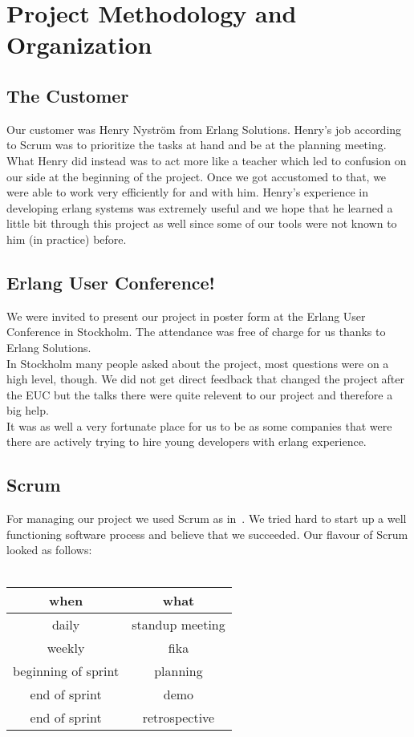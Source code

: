 \documentclass[11pt,a4paper]{report}
\begin{document}
\chapter{Project Methodology and Organization}

\section{The Customer}
Our customer was Henry Nyström from Erlang Solutions. Henry's job according to
Scrum was to prioritize the tasks at hand and be at the planning meeting.
What Henry did instead was to act more like a teacher which led to confusion on
our side at the beginning of the project. Once we got accustomed to that,
we were able to work very efficiently for and with him.
Henry's experience in developing erlang systems was extremely useful and we hope
that he learned a little bit through this project as well since some of our
tools were not known to him (in practice) before.
\section{Erlang User Conference!}
We were invited to present our project in poster form at the
Erlang User Conference in Stockholm. The attendance was free of charge for us thanks to Erlang Solutions. \\
In Stockholm many people asked about the project, most questions were on a high
level, though. We did not get direct feedback that changed the project after the
EUC but the talks there were quite relevent to our project and therefore a big
help. \\
It was as well a very fortunate place for us to be as some companies that were
there are actively trying to hire young developers with erlang experience.
\section{Scrum}
For managing our project we used Scrum as in~\cite{kniberg}.
We tried hard to start up a well functioning software process and believe that
we succeeded. Our flavour of Scrum looked as follows: \\ \\
\begin{tabular}{cc}
  when & what \\ \hline
  daily & standup meeting\\
  weekly & fika \\
  beginning of sprint & planning \\
  end of sprint & demo \\
  end of sprint & retrospective \\
\end{tabular}
\end{document}
